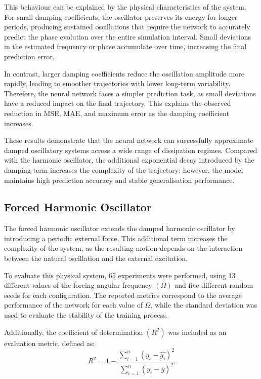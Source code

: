 This behaviour can be explained by the physical characteristics of the system. For small damping coefficients, the oscillator preserves its energy for longer periods, producing sustained oscillations that require the network to accurately predict the phase evolution over the entire simulation interval. Small deviations in the estimated frequency or phase accumulate over time, increasing the final prediction error.

In contrast, larger damping coefficients reduce the oscillation amplitude more rapidly, leading to smoother trajectories with lower long-term variability. Therefore, the neural network faces a simpler prediction task, as small deviations have a reduced impact on the final trajectory. This explains the observed reduction in MSE, MAE, and maximum error as the damping coefficient increases.

These results demonstrate that the neural network can successfully approximate damped oscillatory systems across a wide range of dissipation regimes. Compared with the harmonic oscillator, the additional exponential decay introduced by the damping term increases the complexity of the trajectory; however, the model maintains high prediction accuracy and stable generalisation performance.

\subsection{Forced Harmonic Oscillator}
The forced harmonic oscillator extends the damped harmonic oscillator by introducing a periodic external force. This additional term increases the complexity of the system, as the resulting motion depends on the interaction between the natural oscillation and the external excitation.

To evaluate this physical system, 65 experiments were performed, using 13 different values of the forcing angular frequency $(\Omega)$ and five different random seeds for each configuration. The reported metrics correspond to the average performance of the network for each value of $\Omega$, while the standard deviation was used to evaluate the stability of the training process.

Additionally, the coefficient of determination $(R^2)$ was included as an evaluation metric, defined as:
\begin{equation}
    R^2 = 1-\frac{\sum_{i=1}^{n}(y_i-\hat{y_i})^2}{\sum_{i=1}^{n}(y_i-\bar{y})^2}
\end{equation}

